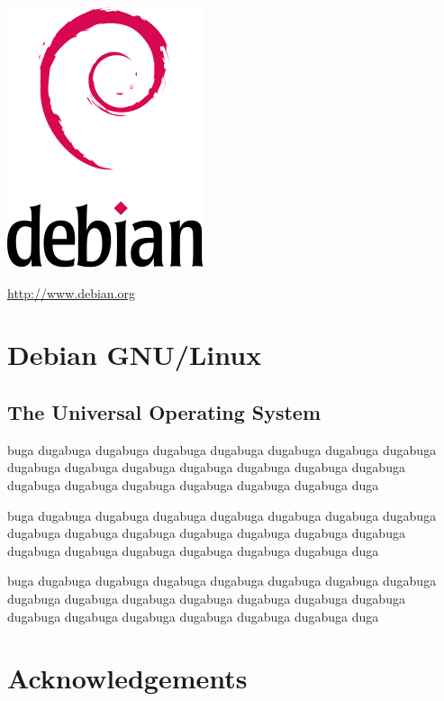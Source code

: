 \documentclass[letterpaper,landscape]{report}
\begin{document}
\begin{multicols}{3}    %

\begin{center}
\noindent
\includegraphics[width=0.5\columnwidth]{openlogo}

\url{http://www.debian.org}
\section*{Debian GNU/Linux}
\subsection*{The Universal Operating System}
\end{center}


buga dugabuga dugabuga dugabuga dugabuga dugabuga dugabuga dugabuga dugabuga dugabuga dugabuga dugabuga dugabuga dugabuga dugabuga dugabuga dugabuga dugabuga dugabuga dugabuga dugabuga duga
\columnbreak

buga dugabuga dugabuga dugabuga dugabuga dugabuga dugabuga dugabuga dugabuga dugabuga dugabuga dugabuga dugabuga dugabuga dugabuga dugabuga dugabuga dugabuga dugabuga dugabuga dugabuga duga
\columnbreak

buga dugabuga dugabuga dugabuga dugabuga dugabuga dugabuga dugabuga dugabuga dugabuga dugabuga dugabuga dugabuga dugabuga dugabuga dugabuga dugabuga dugabuga dugabuga dugabuga dugabuga duga

\section*{Acknowledgements}

\columnbreak
\end{multicols}
\end{document}
